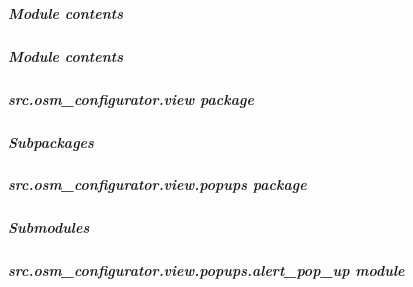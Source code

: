 \documentclass[letterpaper,10pt,english]{sphinxmanual}
\begin{document}
\subparagraph{Module contents}
\label{\detokenize{apidoc/src.osm_configurator.model.project:module-src.osm_configurator.model.project}}\label{\detokenize{apidoc/src.osm_configurator.model.project:module-contents}}

\subparagraph{Module contents}
\label{\detokenize{apidoc/src.osm_configurator.model:module-src.osm_configurator.model}}\label{\detokenize{apidoc/src.osm_configurator.model:module-contents}}
\sphinxstepscope


\subparagraph{src.osm\_configurator.view package}
\label{\detokenize{apidoc/src.osm_configurator.view:src-osm-configurator-view-package}}\label{\detokenize{apidoc/src.osm_configurator.view::doc}}

\subparagraph{Subpackages}
\label{\detokenize{apidoc/src.osm_configurator.view:subpackages}}
\sphinxstepscope


\subparagraph{src.osm\_configurator.view.popups package}
\label{\detokenize{apidoc/src.osm_configurator.view.popups:src-osm-configurator-view-popups-package}}\label{\detokenize{apidoc/src.osm_configurator.view.popups::doc}}

\subparagraph{Submodules}
\label{\detokenize{apidoc/src.osm_configurator.view.popups:submodules}}

\subparagraph{src.osm\_configurator.view.popups.alert\_pop\_up module}
\label{\detokenize{apidoc/src.osm_configurator.view.popups:module-src.osm_configurator.view.popups.alert_pop_up}}\label{\detokenize{apidoc/src.osm_configurator.view.popups:src-osm-configurator-view-popups-alert-pop-up-module}}
\end{document}
